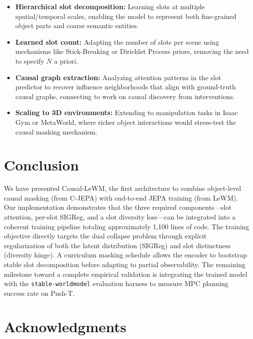 \documentclass[12pt]{article}
\begin{document}
\begin{itemize}[leftmargin=*]
    \item \textbf{Hierarchical slot decomposition:} Learning slots at multiple spatial/temporal scales, enabling the model to represent both fine-grained object parts and coarse semantic entities.
    \item \textbf{Learned slot count:} Adapting the number of slots per scene using mechanisms like Stick-Breaking or Dirichlet Process priors, removing the need to specify $N$ a priori.
    \item \textbf{Causal graph extraction:} Analyzing attention patterns in the slot predictor to recover influence neighborhoods that align with ground-truth causal graphs, connecting to work on causal discovery from interventions.
    \item \textbf{Scaling to 3D environments:} Extending to manipulation tasks in Isaac Gym or MetaWorld, where richer object interactions would stress-test the causal masking mechanism.
\end{itemize}

\section{Conclusion}

We have presented Causal-LeWM, the first architecture to combine object-level causal masking (from C-JEPA) with end-to-end JEPA training (from LeWM). Our implementation demonstrates that the three required components---slot attention, per-slot SIGReg, and a slot diversity loss---can be integrated into a coherent training pipeline totaling approximately 1,100 lines of code. The training objective directly targets the dual collapse problem through explicit regularization of both the latent distribution (SIGReg) and slot distinctness (diversity hinge). A curriculum masking schedule allows the encoder to bootstrap stable slot decomposition before adapting to partial observability. The remaining milestone toward a complete empirical validation is integrating the trained model with the \texttt{stable-worldmodel} evaluation harness to measure MPC planning success rate on Push-T.

\section*{Acknowledgments}
\end{document}
